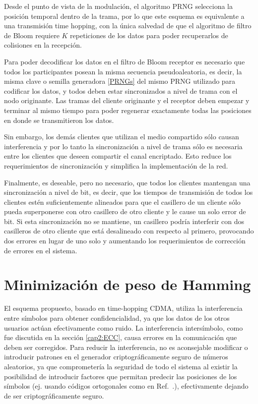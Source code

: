 Desde el punto de vista de la modulación, el algoritmo PRNG selecciona la posición temporal dentro de la trama, por lo que este esquema es equivalente a una transmisión time hopping, con la única salvedad de que el algoritmo de filtro de Bloom requiere $K$ repeticiones de los datos para poder recuperarlos de colisiones en la recepción.

Para poder decodificar los datos en el filtro de Bloom receptor es necesario que todos los participantes posean la misma secuencia pseudoaleatoria, es decir, la misma clave o semilla generadora \ref{PRNGs} del mismo PRNG utilizado para codificar los datos, y todos deben estar sincronizados a nivel de trama con el nodo originante. Las tramas del cliente originante y el receptor deben empezar y terminar al mismo tiempo para poder regenerar exactamente todas las posiciones en donde se transmitieron los datos. 

Sin embargo, los demás clientes que utilizan el medio compartido sólo causan interferencia y por lo tanto la sincronización a nivel de trama sólo es necesaria entre los clientes que deseen compartir el canal encriptado. Esto reduce los requerimientos de sincronización y simplifica la implementación de la red.

Finalmente, es deseable, pero no necesario, que todos los clientes mantengan una sincronización a nivel de bit, es decir, que los tiempos de transmisión de todos los clientes estén suficientemente alineados para que el casillero de un cliente sólo pueda superponerse con otro casillero de otro cliente y le cause un solo error de bit. Si esta sincronización no se mantiene, un casillero podría interferir con dos casilleros de otro cliente que está desalineado con respecto al primero, provocando dos errores en lugar de uno solo y aumentando los requerimientos de corrección de errores en el sistema.

\section{Minimización de peso de Hamming}
\label{miniham}
El esquema propuesto, basado en time-hopping CDMA, utiliza la interferencia entre símbolos para obtener confidencialidad, ya que los datos de los otros usuarios actúan efectivamente como ruido.
La interferencia intersímbolo, como fue discutida en la sección \ref{cap2:ECC}, causa errores en la comunicación que deben ser corregidos. Para reducir la interferencia, no es aconsejable modificar o introducir patrones en el generador criptográficamente seguro de números aleatorios, ya que comprometería la seguridad de todo el sistema al existir la posibilidad de introducir factores que permitan predecir las posiciones de los símbolos (ej. usando códigos ortogonales como en Ref.~\cite{Nadarajah2006}.), efectivamente dejando de ser criptográficamente seguro.

